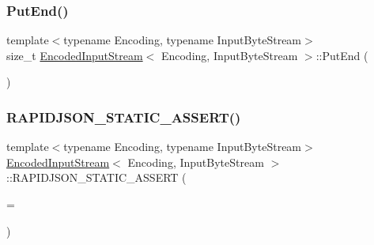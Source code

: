 \mbox{\label{classEncodedInputStream_a83fe5ed281413d6005d1b324730e8bed}} 
\subsubsection{\texorpdfstring{Put\+End()}{PutEnd()}}
{\footnotesize\ttfamily template$<$typename Encoding, typename Input\+Byte\+Stream$>$ \\
size\+\_\+t \hyperlink{classEncodedInputStream}{Encoded\+Input\+Stream}$<$ Encoding, Input\+Byte\+Stream $>$\+::Put\+End (\begin{DoxyParamCaption}\item[{\hyperlink{classEncodedInputStream_acc387a1364390da244bbb1ab07bdceca}{Ch} $\ast$}]{ }\end{DoxyParamCaption})\hspace{0.3cm}{\ttfamily [inline]}}

\mbox{\label{classEncodedInputStream_acc6c2b46e636edfeb81dfaea80ee384a}} 
\subsubsection{\texorpdfstring{R\+A\+P\+I\+D\+J\+S\+O\+N\+\_\+\+S\+T\+A\+T\+I\+C\+\_\+\+A\+S\+S\+E\+R\+T()}{RAPIDJSON\_STATIC\_ASSERT()}}
{\footnotesize\ttfamily template$<$typename Encoding, typename Input\+Byte\+Stream$>$ \\
\hyperlink{classEncodedInputStream}{Encoded\+Input\+Stream}$<$ Encoding, Input\+Byte\+Stream $>$\+::R\+A\+P\+I\+D\+J\+S\+O\+N\+\_\+\+S\+T\+A\+T\+I\+C\+\_\+\+A\+S\+S\+E\+RT (\begin{DoxyParamCaption}\item[{sizeof(typename Input\+Byte\+Stream\+::\+Ch)}]{ = {} }\end{DoxyParamCaption})\hspace{0.3cm}{\ttfamily [private]}}

